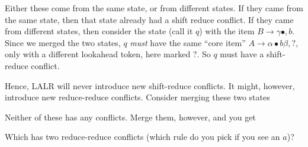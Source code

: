\begin{center}
\end{center}

Either these come from the same state, or from different states. If they came from the same state, then that state already had a shift reduce conflict. If they came from different states, then consider the state (call it $q$) with the item $B \to \gamma \bullet, b$. Since we merged the two states, $q$ \textit{must} have the same ``core item'' $A \to \alpha \bullet b \beta, ?$, only with a different lookahead token, here marked $?$. So $q$ must have a shift-reduce conflict.

Hence, LALR will never introduce new shift-reduce conflicts. It might, however, introduce new reduce-reduce conflicts. Consider merging these two states
\begin{center}
\end{center}
Neither of these has any conflicts. Merge them, however, and you get
\begin{center}
\end{center}
Which has two reduce-reduce conflicts (which rule do you pick if you see an $a$)?

